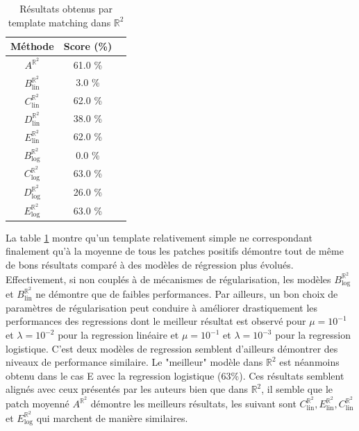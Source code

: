\documentclass{article}
\begin{document}
\begin{table}[h!]
    \centering
    \begin{tabular}{|c|c|c|}
        \hline
        Méthode & Score (\%)\\
        \hline
        \hline
        $A^{\mathbb{R}^2}$& 61.0 \% \\
        \hline
        $B_{\text{lin}}^{\mathbb{R}^2}$& 3.0 \%    \\
        $C_{\text{lin}}^{\mathbb{R}^2}$& 62.0 \%   \\
        $D_{\text{lin}}^{\mathbb{R}^2}$& 38.0 \%   \\
        $E_{\text{lin}}^{\mathbb{R}^2}$& 62.0 \%   \\
        \hline
        $B_{\text{log}}^{\mathbb{R}^2} $& 0.0 \%   \\ 
        $C_{\text{log}}^{\mathbb{R}^2} $& 63.0 \%  \\ 
        $D_{\text{log}}^{\mathbb{R}^2} $& 26.0 \%   \\ 
        $E_{\text{log}}^{\mathbb{R}^2} $& 63.0 \%  \\ 
        \hline
    \end{tabular}
    \caption{Résultats obtenus par template matching dans $\mathbb{R}^2$}
    \label{table: R2}
\end{table}

La table \ref{table: R2} montre qu'un template relativement simple ne correspondant finalement qu'à la moyenne de tous les patches positifs démontre tout de même de bons
résultats comparé à des modèles de régression plus évolués. Effectivement, si non couplés à de mécanismes de régularisation, les modèles $B_{\text{log}}^{\mathbb{R}^2} $ et 
$B_{\text{lin}}^{\mathbb{R}^2} $ ne démontre que de faibles performances. Par ailleurs, un bon choix de paramètres de régularisation peut conduire à améliorer drastiquement les 
performances des regressions dont le meilleur résultat est observé pour $\mu = 10^{-1}$ et $\lambda = 10^{-2}$ pour la regression linéaire et $\mu = 10^{-1}$ et $\lambda = 10^{-3}$ pour la regression logistique.
C'est deux modèles de regression semblent d'ailleurs démontrer des niveaux de performance similaire.
Le "meilleur" modèle dans $\mathbb{R}^2$ est néanmoins obtenu dans le cas E avec la regression logistique (63\%). Ces résultats semblent alignés avec ceux présentés par les auteurs bien que dans $\mathbb{R}^2$, 
il semble que le patch moyenné $A^{\mathbb{R}^2}$ démontre les meilleurs résultats, les
suivant sont $C_{\text{lin}}^{\mathbb{R}^2}, E_{\text{lin}}^{\mathbb{R}^2},
C_{\text{lin}}^{\mathbb{R}^2}$ et $E_{\text{log}}^{\mathbb{R}^2}$ qui marchent de manière 
similaires.
\end{document}
